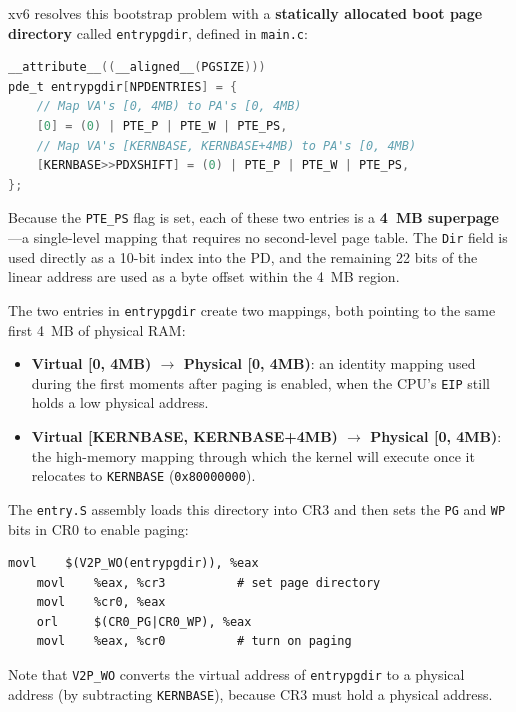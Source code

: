 \documentclass[11pt]{article}
\begin{document}
xv6 resolves this bootstrap problem with a \textbf{statically allocated boot page directory} called \texttt{entrypgdir}, defined in \texttt{main.c}:

\begin{lstlisting}[language=C, caption={entrypgdir in main.c --- the xv6 bootstrap page directory}]
__attribute__((__aligned__(PGSIZE)))
pde_t entrypgdir[NPDENTRIES] = {
    // Map VA's [0, 4MB) to PA's [0, 4MB)
    [0] = (0) | PTE_P | PTE_W | PTE_PS,
    // Map VA's [KERNBASE, KERNBASE+4MB) to PA's [0, 4MB)
    [KERNBASE>>PDXSHIFT] = (0) | PTE_P | PTE_W | PTE_PS,
};
\end{lstlisting}

Because the \texttt{PTE\_PS} flag is set, each of these two entries is a \textbf{4~MB superpage}---a single-level mapping that requires no second-level page table. The \texttt{Dir} field is used directly as a 10-bit index into the PD, and the remaining 22 bits of the linear address are used as a byte offset within the 4~MB region.

The two entries in \texttt{entrypgdir} create two mappings, both pointing to the same first 4~MB of physical RAM:
\begin{itemize}
    \item \textbf{Virtual [0, 4MB) $\to$ Physical [0, 4MB)}: an identity mapping used during the first moments after paging is enabled, when the CPU's \texttt{EIP} still holds a low physical address.
    \item \textbf{Virtual [KERNBASE, KERNBASE+4MB) $\to$ Physical [0, 4MB)}: the high-memory mapping through which the kernel will execute once it relocates to \texttt{KERNBASE} (\texttt{0x80000000}).
\end{itemize}

The \texttt{entry.S} assembly loads this directory into CR3 and then sets the \texttt{PG} and \texttt{WP} bits in CR0 to enable paging:

\begin{lstlisting}[language={[x86masm]Assembler}, caption={Loading entrypgdir and enabling paging in entry.S}]
    movl    $(V2P_WO(entrypgdir)), %eax
    movl    %eax, %cr3          # set page directory
    movl    %cr0, %eax
    orl     $(CR0_PG|CR0_WP), %eax
    movl    %eax, %cr0          # turn on paging
\end{lstlisting}

Note that \texttt{V2P\_WO} converts the virtual address of \texttt{entrypgdir} to a physical address (by subtracting \texttt{KERNBASE}), because CR3 must hold a physical address.
\end{document}

